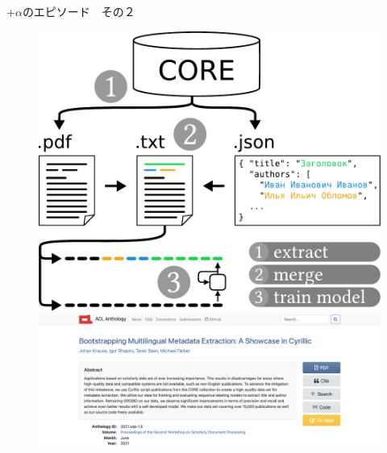 \documentclass[lualatex,aspectratio=169]{beamer}
\begin{document}
\begin{frame}[t]{+$\alpha$のエピソード　その２}
\begin{figure}
\begin{overprint}
            \begin{center}\includegraphics[height=0.45\textheight]{./img/cyr_ppr_1_2.pdf}\end{center}
            \begin{center}\includegraphics[height=0.45\textheight]{./img/cyr_ppr_1_1.png}\end{center}

\end{overprint}
\end{figure}
\end{frame}
\end{document}
